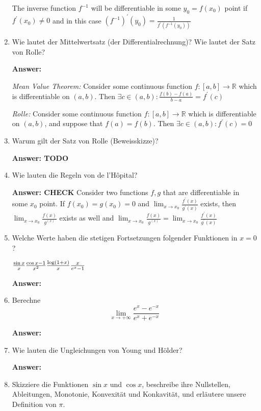 \documentclass[11pt]{article}
\newcommand{\RR}[0]{\mathbb{R}}
\begin{document}
\begin{enumerate}
    The inverse function $f^{-1}$ will be differentiable in some $y_0 = f(x_0)$ point if $f^\prime(x_0) \neq 0$ and in this case $(f^{-1})^\prime(y_0) = \frac{1}{f^\prime(f^{-1}(y_0))}$
    \item Wie lautet der Mittelwertsatz (der Differentialrechnung)? Wie lautet der Satz von
    Rolle?

    \textbf{Answer:}

    \textit{Mean Value Theorem:} Consider some continuous function $f\colon [a, b] \to \RR$ which is differentiable on $(a, b)$. Then $\exists c \in (a, b)\colon \frac{f(b) - f(a)}{b - a} = f^\prime(c)$

    \textit{Rolle:} Consider some continuous function $f\colon [a, b] \to \RR$ which is differentiable on $(a, b)$, and suppose that $f(a) = f(b)$. Then $\exists c\in(a, b)\colon f^\prime(c) = 0$

    \item Warum gilt der Satz von Rolle (Beweisskizze)?
    
    \textbf{Answer: TODO} 

    \item Wie lauten die Regeln von de l'Hôpital?
    
    \textbf{Answer: CHECK} Consider two functions $f, g$ that are differentiable in some $x_0$ point. If $f(x_0) = g(x_0) = 0$ and $\lim_{x \to x_0}\frac{f^\prime(x)}{g^\prime(x)}$ exists, then $\lim_{x \to x_0}\frac{f(x)}{g^(x)}$ exists as well and $\lim_{x \to x_0}\frac{f(x)}{g^(x)} = \lim_{x \to x_0}\frac{f^\prime(x)}{g^\prime(x)}$
    \item Welche Werte haben die stetigen Fortsetzungen folgender Funktionen in $x = 0$?
    
    \hspace*{\fill}
    $\frac{\sin{x}}{x} \hfill \frac{\cos{x} - 1}{x^2} \hfill \frac{\log(1+x)}{x} \hfill \frac{x}{e^x -1}$
    \hspace*{\fill}

    \textbf{Answer:}

    \item Berechne
    $$\lim_{x \to +\infty}\frac{e^x - e^{-x}}{e^x + e^{-x}}$$

    \textbf{Answer:}
    \item Wie lauten die Ungleichungen von Young und Hölder?
    
    \textbf{Answer:}
    \item Skizziere die Funktionen $\sin{x}$ und $\cos{x}$, beschreibe ihre Nullstellen, Ableitungen, Monotonie, Konvexität und Konkavität, und erläutere unsere Definition von $\pi$.


\end{enumerate}
\end{document}
